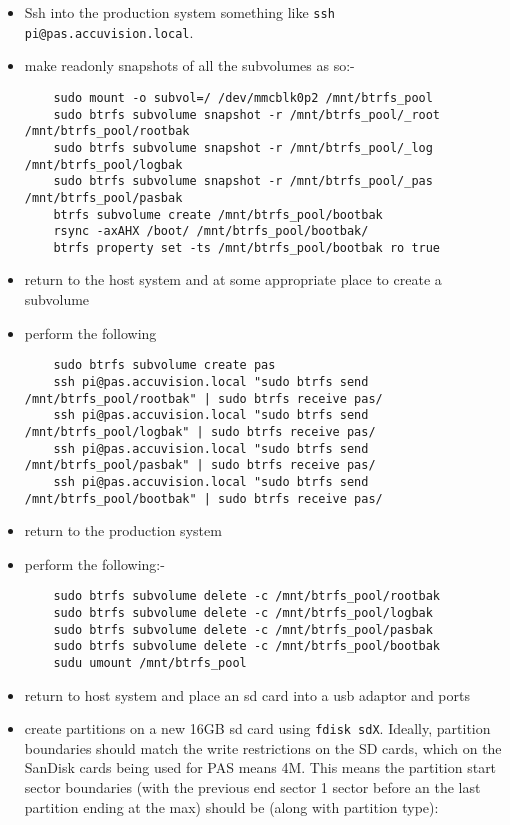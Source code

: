\documentclass[Draft]{akc}
\begin{document}
\begin{itemize}
  \item Ssh into the production system something like \texttt{ssh pi@pas.accuvision.local}.
  \item make readonly snapshots of all the subvolumes as so:-
  \begin{lstlisting}
    sudo mount -o subvol=/ /dev/mmcblk0p2 /mnt/btrfs_pool
    sudo btrfs subvolume snapshot -r /mnt/btrfs_pool/_root /mnt/btrfs_pool/rootbak
    sudo btrfs subvolume snapshot -r /mnt/btrfs_pool/_log /mnt/btrfs_pool/logbak
    sudo btrfs subvolume snapshot -r /mnt/btrfs_pool/_pas /mnt/btrfs_pool/pasbak
    btrfs subvolume create /mnt/btrfs_pool/bootbak
    rsync -axAHX /boot/ /mnt/btrfs_pool/bootbak/
    btrfs property set -ts /mnt/btrfs_pool/bootbak ro true
  \end{lstlisting}
  \item return to the host system and at some appropriate place to create a subvolume
  \item perform the following
  \begin{lstlisting}
    sudo btrfs subvolume create pas
    ssh pi@pas.accuvision.local "sudo btrfs send /mnt/btrfs_pool/rootbak" | sudo btrfs receive pas/
    ssh pi@pas.accuvision.local "sudo btrfs send /mnt/btrfs_pool/logbak" | sudo btrfs receive pas/
    ssh pi@pas.accuvision.local "sudo btrfs send /mnt/btrfs_pool/pasbak" | sudo btrfs receive pas/
    ssh pi@pas.accuvision.local "sudo btrfs send /mnt/btrfs_pool/bootbak" | sudo btrfs receive pas/
  \end{lstlisting}
  \item return to the production system
  \item perform the following:-
  \begin{lstlisting}
    sudo btrfs subvolume delete -c /mnt/btrfs_pool/rootbak
    sudo btrfs subvolume delete -c /mnt/btrfs_pool/logbak
    sudo btrfs subvolume delete -c /mnt/btrfs_pool/pasbak
    sudo btrfs subvolume delete -c /mnt/btrfs_pool/bootbak
    sudu umount /mnt/btrfs_pool
  \end{lstlisting}
  \item return to host system and place an sd card into a usb adaptor and ports
  \item create partitions on a new 16GB sd card using \texttt{fdisk sdX}.  Ideally, partition boundaries should
  match the write restrictions on the SD cards, which on the SanDisk cards being used for PAS means 4M.  This means the
  partition start sector boundaries (with the previous end sector 1 sector before an the last partition ending at the max) should be (along with partition type):

\end{itemize}
\end{document}
